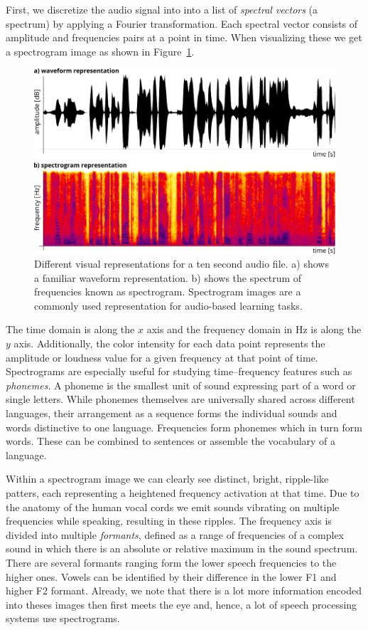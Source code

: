 First, we discretize the audio signal into into a list of \emph{spectral vectors} (a spectrum) by applying a Fourier transformation. Each spectral vector consists of amplitude and frequencies pairs at a point in time. When visualizing these we get a spectrogram image as shown in Figure~\ref{fig:waveform}. 
%
	\begin{figure}[tp]
  		\centering
    	\includegraphics{img/waveform.pdf}
    	\caption{Different visual representations for a ten second audio file. a) shows a familiar waveform representation. b) shows the spectrum of frequencies known as spectrogram. Spectrogram images  are a commonly used representation for audio-based learning tasks.}
    	\label{fig:waveform}
	\end{figure}
%

The time domain is along the $x$ axis and the frequency domain in Hz is along the $y$ axis. Additionally, the color intensity for each data point represents the amplitude or loudness value for a given frequency at that point of time. Spectrograms are especially useful for studying time--frequency features such as \emph{phonemes}. A phoneme is the smallest unit of sound expressing part of a word or single letters. While phonemes themselves are universally shared across different languages, their arrangement as a sequence forms the individual sounds and words distinctive to one language. Frequencies form phonemes which in turn form words. These can be combined to sentences or assemble the vocabulary of a language.

Within a spectrogram image we can clearly see distinct, bright, ripple-like patters, each representing a heightened frequency activation at that time. Due to the anatomy of the human vocal cords we emit sounds vibrating on multiple frequencies while speaking, resulting in these ripples. 
The frequency axis is divided into multiple \emph{formants}, defined as a range of frequencies of a complex sound in which there is an absolute or relative maximum in the sound spectrum. There are several formants ranging form the lower speech frequencies to the higher ones. Vowels can be identified by their difference in the lower F1 and higher F2 formant. Already, we note that there is a lot more information encoded into theses images then first meets the eye and, hence, a lot of speech processing systems use spectrograms.

